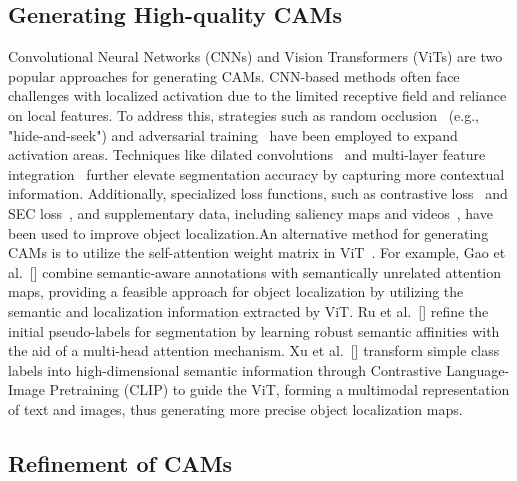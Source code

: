     
    
\subsection{Generating High-quality CAMs}

    Convolutional Neural Networks (CNNs) \cite{qi2025medconv} and Vision Transformers (ViTs) \cite{wu2024xlip,ji2024sine,zhang2024jointvit} are two popular approaches for generating CAMs. CNN-based methods often face challenges with localized activation due to the limited receptive field and reliance on local features. To address this, strategies such as random occlusion~\cite{kumar2017hide} (e.g., "hide-and-seek") and adversarial training~\cite{kweon2023weakly} have been employed to expand activation areas. Techniques like dilated convolutions~\cite{huang2018weakly} and multi-layer feature integration~\cite{li2022weakly} further elevate segmentation accuracy by capturing more contextual information. Additionally, specialized loss functions, such as contrastive loss~\cite{zhu2024weakclip} and SEC loss~\cite{wu2022adaptive}, and supplementary data, including saliency maps and videos~\cite{wang2018weakly}, have been used to improve object localization.An alternative method for generating CAMs is to utilize the self-attention weight matrix in ViT~\cite{dosovitskiy2021image}. For example, Gao et al.~[\citeyear{gao2021ts}] combine semantic-aware annotations with semantically unrelated attention maps, providing a feasible approach for object localization by utilizing the semantic and localization information extracted by ViT. Ru et al.~[\citeyear{ru2022learning}] refine the initial pseudo-labels for segmentation by learning robust semantic affinities with the aid of a multi-head attention mechanism. Xu et al.~[\citeyear{xu2023learning}] transform simple class labels into high-dimensional semantic information through Contrastive Language-Image Pretraining (CLIP) to guide the ViT, forming a multimodal representation of text and images, thus generating more precise object localization maps.
    
\subsection{Refinement of CAMs}

